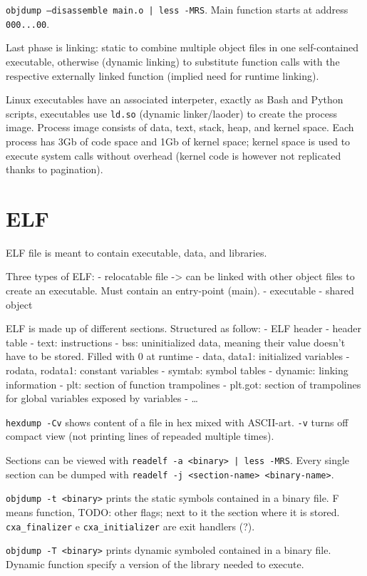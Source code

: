 \texttt{objdump --disassemble main.o | less -MRS}. Main function starts at address \texttt{000...00}.

Last phase is linking: static to combine multiple object files in one self-contained executable, otherwise (dynamic linking) to substitute function calls with the respective externally linked function (implied need for runtime linking).

Linux executables have an associated interpeter, exactly as Bash and Python scripts, executables use \texttt{ld.so} (dynamic linker/laoder) to create the process image.
Process image consists of data, text, stack, heap, and kernel space.
Each process has 3Gb of code space and 1Gb of kernel space; kernel space is used to execute system calls without overhead (kernel code is however not replicated thanks to pagination).

\section{ELF}
ELF file is meant to contain executable, data, and libraries.

Three types of ELF:
- relocatable file -> can be linked with other object files to create an executable. Must contain an entry-point (main).
- executable
- shared object

ELF is made up of different sections. Structured as follow:
- ELF header
- header table
- text: instructions
- bss: uninitialized data, meaning their value doesn't have to be stored. Filled with 0 at runtime
- data, data1: initialized variables
- rodata, rodata1: constant variables
- symtab: symbol tables
- dynamic: linking information
- plt: section of function trampolines
- plt.got: section of trampolines for global variables exposed by variables
- \dots

\texttt{hexdump -Cv} shows content of a file in hex mixed with ASCII-art. \texttt{-v} turns off compact view (not printing lines of repeaded multiple times).

Sections can be viewed with \texttt{readelf -a <binary> | less -MRS}. Every single section can be dumped with \texttt{readelf -j <section-name> <binary-name>}.

\texttt{objdump -t <binary>} prints the static symbols contained in a binary file. F means function, TODO: other flags; next to it the section where it is stored. \texttt{cxa_finalizer} e \texttt{cxa_initializer} are exit handlers (?).

\texttt{objdump -T <binary>} prints dynamic symboled contained in a binary file.
Dynamic function specify a version of the library needed to execute.

